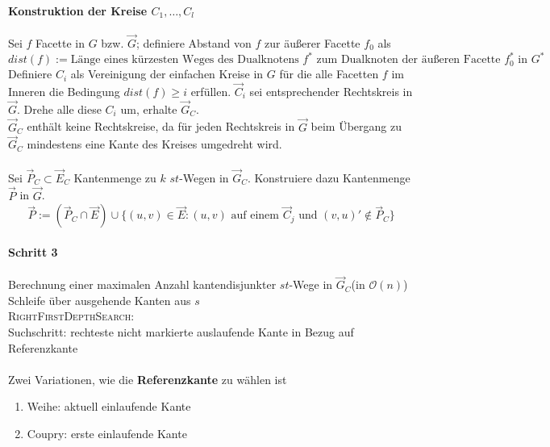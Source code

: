 \documentclass{article}
\newcommand{\df}[1]{\textbf{#1}\index{#1}}
\renewcommand{\O}[1]{\mathcal{O}\left(#1\right)}
\begin{document}
\paragraph{Konstruktion der Kreise $C_1, \ldots, C_l$}
Sei $f$ Facette in $G$ bzw. $\overrightarrow{G}$; definiere Abstand von $f$ zur äußerer Facette $f_0$ als
\[dist(f) := \text{Länge eines kürzesten Weges des Dualknotens }f^* \text{ zum Dualknoten der äußeren Facette }f_0^* \text{ in }G^*\]
Definiere $C_i$ als Vereinigung der einfachen Kreise in $G$ für die alle Facetten $f$ im Inneren die Bedingung $dist(f) \geq i$ erfüllen. $\overrightarrow{C}_i$ sei entsprechender Rechtskreis in $\overrightarrow{G}$.
Drehe alle diese $C_i$ um, erhalte $\overrightarrow{G}_C$.\\


$\overrightarrow{G}_C$ enthält keine Rechtskreise, da für jeden Rechtskreis in $\overrightarrow{G}$ beim Übergang zu $\overrightarrow{G}_C$ mindestens eine Kante des Kreises umgedreht wird.\\\\

Sei $\overrightarrow{P}_C \subset \overrightarrow{E}_C$ Kantenmenge zu $k$ $st$-Wegen in $\overrightarrow{G}_C$. Konstruiere dazu Kantenmenge $\overrightarrow{P}$ in $\overrightarrow{G}$.
\[\overrightarrow{P} := (\overrightarrow{P}_C \cap \overrightarrow{E})\cup
\{(u,v) \in \overrightarrow{E}: (u,v) \text{ auf einem }\overrightarrow{C}_j \text{ und }(v,u)' \notin \overrightarrow{P}_C \}
\]

\paragraph{Schritt 3}
Berechnung einer maximalen Anzahl kantendisjunkter $st$-Wege in $\overrightarrow{G}_C$(in $\O{n}$)\\
Schleife über ausgehende Kanten aus $s$\\
\textsc{RightFirstDepthSearch}:\\
Suchschritt: rechteste nicht markierte auslaufende Kante in Bezug auf Referenzkante\\\\

Zwei Variationen, wie die \df{Referenzkante} zu wählen ist
\begin{enumerate}
	\item Weihe: aktuell einlaufende Kante
	\item Coupry: erste einlaufende Kante
\end{enumerate}
\end{document}
